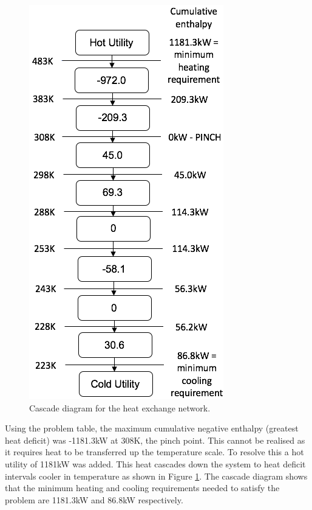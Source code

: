 \begin{figure}
\includegraphics[width=0.9\linewidth]{./pictures/cascadediagram2} 
\caption{Cascade diagram for the heat exchange network.}
\label{fig:cascade}
\end{figure}
Using the problem table, the maximum cumulative negative enthalpy (greatest heat deficit) was -1181.3kW at 308K, the pinch point. This cannot be realised as it requires heat to be transferred up the temperature scale. To resolve this a hot utility of 1181kW was added. This heat cascades down the system to heat deficit intervals cooler in temperature as shown in Figure \ref{fig:cascade}. The cascade diagram shows that the minimum heating and cooling requirements needed to satisfy the problem are 1181.3kW and 86.8kW respectively.

